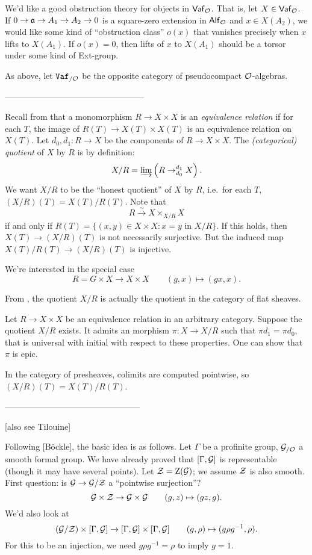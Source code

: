 \documentclass[phd,cornellheadings,draft]{cornell}
\begin{document}
We'd like a good obstruction theory for objects in $\mathsf{Vaf}_{\mathcal{O}}$. That 
is, let $X\in \mathsf{Vaf}_{\mathcal{O}}$. If $0 \to \mathfrak{a}\to A_1\to A_2\to 0$ is a 
square-zero extension in $\mathsf{Alf}_{\mathcal{O}}$ and $x\in X(A_2)$, we would like 
some kind of ``obstruction class'' $o(x)$ that vanishes precisely when 
$x$ lifts to $X(A_1)$. If $o(x)=0$, then lifts of $x$ to $X(A_1)$ should 
be a torsor under some kind of Ext-group. 

As above, let $\mathtt{Vaf}_{/\mathcal{O}}$ be the opposite category of pseudocompact 
$\mathcal{O}$-algebras. 

--------------------------------------------------

Recall from \cite[V.2.b]{sga3-i} that a monomorphism $R\to X\times X$ is an 
\emph{equivalence relation} if for each $T$, the image of 
$R(T)\to X(T)\times X(T)$ is an equivalence relation on $X(T)$. Let 
$d_0,d_1\colon R\to X$ be the components of $R\to X\times X$. The 
\emph{(categorical) quotient} of $X$ by $R$ is by definition:
\[
  X/R = \varinjlim\left(R\to_{d_0}^{d_1} X\right) .
\]
We want $X/R$ to be the ``honest quotient'' of $X$ by $R$, i.e.~for each $T$, 
$(X/R)(T) = X(T)/R(T)$. Note that 
\[
  R\xrightarrow\sim X\times_{X/R} X
\]
if and only if $R(T)=\{(x,y)\in X\times X\colon x=y\text{ in }X/R\}$. If this 
holds, then $X(T)\to (X/R)(T)$ is not necessarily surjective. But the induced 
map $X(T)/R(T)\to (X/R)(T)$ is injective. 

We're interested in the special case 
\[
  R = G\times X\to X\times X\qquad (g,x)\mapsto (g x,x) .
\]

From \cite[VII\textsubscript{B}.1.5]{sga3-i}, the quotient $X/R$ is actually 
the quotient in the category of flat sheaves. 

Let $R\to X\times X$ be an equivalence relation in an arbitrary category. Suppose 
the quotient $X/R$ exists. It admits an morphism $\pi\colon X\to X/R$ such that 
$\pi d_1 = \pi d_0$, that is universal with initial with respect to these 
properties. One can show that $\pi$ is epic. 

In the category of presheaves, colimits are computed pointwise, so 
$(X/R)(T) = X(T)/R(T)$. 

------------------------------------------------

[also see Tilouine]

Following [B\"ockle], the basic idea is as follows. Let $\Gamma$ be a profinite 
group, $\mathcal{G}_{/\mathcal{O}}$ a smooth formal group. We have already proved that 
$[\Gamma,\mathcal{G}]$ is representable (though it may have several points). Let 
$\mathcal{Z}=\operatorname{Z}(\mathcal{G})$; we assume $\mathcal{Z}$ is also smooth. First question: is 
$\mathcal{G}\to \mathcal{G}/\mathcal{Z}$ a ``pointwise surjection''?
\[
  \mathcal{G}\times \mathcal{Z}\to \mathcal{G}\times \mathcal{G} \qquad (g,z)\mapsto (g z,g) .
\]
We'd also look at 
\[
  (\mathcal{G}/\mathcal{Z})\times [\Gamma,\mathcal{G}]\to [\Gamma,\mathcal{G}]\times [\Gamma,\mathcal{G}]\qquad (g,\rho) \mapsto (g \rho g^{-1}, \rho) .
\]
For this to be an injection, we need $g\rho g^{-1} = \rho$ to imply 
$g=1$. 
\end{document}
